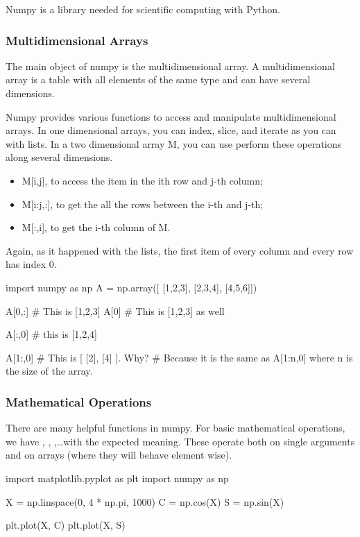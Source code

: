 Numpy is a library needed for scientific computing with Python. 

\subsubsection{Multidimensional Arrays}

The main object of numpy is the multidimensional array. A multidimensional
array is a table with all elements of the same type and can have several
dimensions.

Numpy provides various functions to access and manipulate multidimensional
arrays. In one dimensional arrays, you can index, slice, and iterate as you can
with lists. In a two dimensional array M, you can use perform these operations
along several dimensions.

\begin{itemize}
 \item M[i,j], to access the item in the ith row and j-th column; 
 \item M[i:j,:], to get the all the rows between the i-th and j-th;
 \item M[:,i], to get the i-th column of M.
\end{itemize}

Again, as it happened with the lists, the first item of every column and every row has index 0.

\begin{python}
import numpy as np
A = np.array([
    [1,2,3],
    [2,3,4],
    [4,5,6]])

A[0,:] # This is [1,2,3]
A[0] # This is [1,2,3] as well

A[:,0] # this is [1,2,4]

A[1:,0] # This is [ [2], [4] ]. Why?
        # Because it is the same as A[1:n,0] where n is the size of the array.
\end{python}

\subsubsection{Mathematical Operations}

There are many helpful functions in numpy. For basic mathematical operations, we have , ,
,\ldots with the expected meaning. These operate both on single
arguments and on arrays (where they will behave element wise).

\begin{python}
import matplotlib.pyplot as plt
import numpy as np

X = np.linspace(0, 4 * np.pi, 1000)
C = np.cos(X)
S = np.sin(X)

plt.plot(X, C)
plt.plot(X, S)
\end{python}

